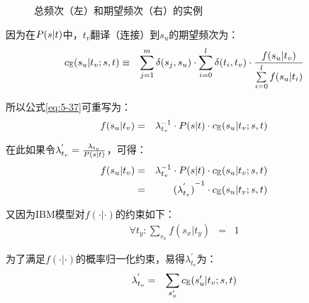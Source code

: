 \begin{figure}[htp]
    \centering
\subfigure{}
\subfigure{}
   \caption{总频次（左）和期望频次（右）的实例}
   \label{fig:5-26}
\end{figure}

\vspace{-0.5em}
\parinterval 因为在${P}({s}|{t})$中，$t_v$翻译（连接）到$s_u$的期望频次为：
\vspace{-0.5em}
\begin{eqnarray}
c_{\mathbb{E}}(s_u|t_v;{s},{t}) & \equiv & \sum\limits_{j=1}^{m} \delta(s_j,s_u) \cdot \sum\limits_{i=0}^{l} \delta(t_i,t_v) \cdot \frac {f(s_u|t_v)}{\sum\limits_{i=0}^{l}f(s_u|t_i)}
\label{eq:5-39}
\end{eqnarray}

\vspace{-0.5em}
\parinterval 所以公式\ref {eq:5-37}可重写为：
\vspace{-0.5em}
\begin{eqnarray}
f(s_u|t_v)&=&\lambda_{t_v}^{-1} \cdot {P}({s}| {t}) \cdot c_{\mathbb{E}}(s_u|t_v;{s},{t})
\label{eq:5-40}
\end{eqnarray}

\vspace{-0.5em}
\parinterval 在此如果令$\lambda_{t_v}^{'}=\frac{\lambda_{t_v}}{{P}({s}| {t})}$，可得：
\vspace{-0.5em}
\begin{eqnarray}
f(s_u|t_v) &= &\lambda_{t_v}^{-1} \cdot {P}({s}| {t}) \cdot c_{\mathbb{E}}(s_u|t_v;{s},{t}) \nonumber \\
 &=&{(\lambda_{t_v}^{'})}^{-1} \cdot c_{\mathbb{E}}(s_u|t_v;{s},{t})
\label{eq:5-41}
\end{eqnarray}

\vspace{-0.5em}
\parinterval 又因为IBM模型对$f(\cdot|\cdot)$的约束如下：
\vspace{-0.5em}
\begin{eqnarray}
\forall t_y : \sum\limits_{s_x} f(s_x|t_y) &=& 1
\label{eq:5-42}
\end{eqnarray}

\vspace{-0.5em}
\parinterval 为了满足$f(\cdot|\cdot)$的概率归一化约束，易得$\lambda_{t_v}^{'}$为：
\vspace{-0.5em}
\begin{eqnarray}
\lambda_{t_v}^{'}&=&\sum\limits_{s'_u} c_{\mathbb{E}}(s'_u|t_v;{s},{t})
\label{eq:5-43}
\end{eqnarray}

